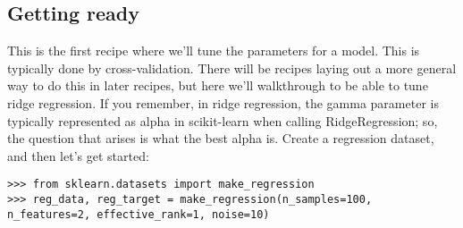 \documentclass[SKL-MASTER.tex]{subfiles}
\begin{document}
\subsection*{Getting ready}
This is the first recipe where we'll tune the parameters for a model. This is typically done by
cross-validation. There will be recipes laying out a more general way to do this in later recipes,
but here we'll walkthrough to be able to tune ridge regression.
If you remember, in ridge regression, the gamma parameter is typically represented as alpha
in scikit-learn when calling RidgeRegression; so, the question that arises is what the best
alpha is. Create a regression dataset, and then let's get started:
\begin{framed}
	\begin{verbatim}
>>> from sklearn.datasets import make_regression
>>> reg_data, reg_target = make_regression(n_samples=100,
n_features=2, effective_rank=1, noise=10)
\end{verbatim}
\end{framed}
\end{document}
